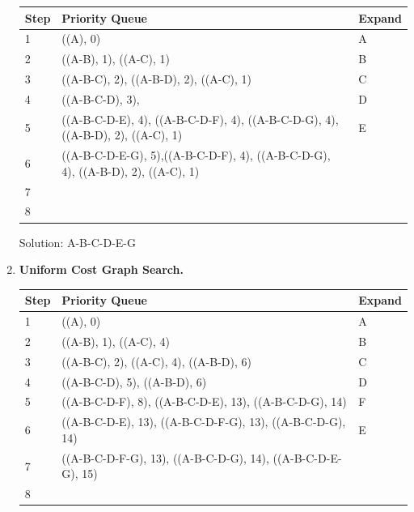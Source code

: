 \documentclass[11pt]{article}
\begin{document}
\begin{enumerate}
    \begin{center}
    \begin{tabular}{|l|l@{\hspace*{0.1in}}|l|} \hline
    \bf Step & \bf Priority Queue                                   & \bf Expand \\ \hline
    1 & ((A), 0)                                                                       &  A\\ \hline
    2 & ((A-B), 1), ((A-C), 1)                                                         &  B\\ \hline
    3 & ((A-B-C), 2), ((A-B-D), 2), ((A-C), 1)                                         &  C\\ \hline
    4 & ((A-B-C-D), 3),                                                                &  D\\ \hline
    5 & ((A-B-C-D-E), 4), ((A-B-C-D-F), 4), ((A-B-C-D-G), 4), ((A-B-D), 2), ((A-C), 1) &  E\\ \hline
    6 & ((A-B-C-D-E-G), 5),((A-B-C-D-F), 4), ((A-B-C-D-G), 4), ((A-B-D), 2), ((A-C), 1)&  \\ \hline
    7 &                                                             &  \\ \hline
    8 &                                                             &  \\ \hline
    \end{tabular}
    \end{center}

    Solution: A-B-C-D-E-G

  \item {\bf  Uniform Cost Graph Search.} \\

    \begin{center}
    \begin{tabular}{|l|l@{\hspace*{1in}}|l|} \hline
    \bf Step & \bf Priority Queue                                   & \bf Expand \\ \hline
    1 & ((A), 0)                                                        & A \\ \hline
    2 & ((A-B), 1), ((A-C), 4)                                          & B \\ \hline
    3 & ((A-B-C), 2), ((A-C), 4), ((A-B-D), 6)                          & C \\ \hline
    4 & ((A-B-C-D), 5), ((A-B-D), 6)                                    & D \\ \hline
    5 & ((A-B-C-D-F), 8), ((A-B-C-D-E), 13), ((A-B-C-D-G), 14)          & F\\ \hline
    6 & ((A-B-C-D-E), 13), ((A-B-C-D-F-G), 13), ((A-B-C-D-G), 14)       & E \\ \hline
    7 & ((A-B-C-D-F-G), 13), ((A-B-C-D-G), 14), ((A-B-C-D-E-G), 15)     &  \\ \hline
    8 &                                                                 &  \\ \hline
    \end{tabular}
    \end{center}


\end{enumerate}
\end{document}
